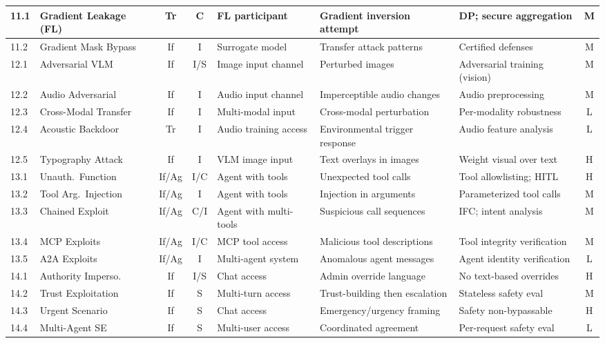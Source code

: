 \documentclass[conference]{IEEEtran}
\begin{document}
{\begin{longtable}{p{0.7cm}p{1.5cm}ccp{1.6cm}p{1.5cm}p{1.6cm}c}
\midrule
11.1 & Gradient Leakage (FL) & Tr & C & FL participant & Gradient inversion attempt & DP; secure aggregation & M \\
\midrule
11.2 & Gradient Mask Bypass & If & I & Surrogate model & Transfer attack patterns & Certified defenses & M \\
\midrule
12.1 & Adversarial VLM & If & I/S & Image input channel & Perturbed images & Adversarial training (vision) & M \\
\midrule
12.2 & Audio Adversarial & If & I & Audio input channel & Imperceptible audio changes & Audio preprocessing & M \\
\midrule
12.3 & Cross-Modal Transfer & If & I & Multi-modal input & Cross-modal perturbation & Per-modality robustness & L \\
\midrule
12.4 & Acoustic Backdoor & Tr & I & Audio training access & Environmental trigger response & Audio feature analysis & L \\
\midrule
12.5 & Typography Attack & If & I & VLM image input & Text overlays in images & Weight visual over text & H \\
\midrule
13.1 & Unauth.\ Function & If/Ag & I/C & Agent with tools & Unexpected tool calls & Tool allowlisting; HITL & H \\
\midrule
13.2 & Tool Arg.\ Injection & If/Ag & I & Agent with tools & Injection in arguments & Parameterized tool calls & M \\
\midrule
13.3 & Chained Exploit & If/Ag & C/I & Agent with multi-tools & Suspicious call sequences & IFC; intent analysis & M \\
\midrule
13.4 & MCP Exploits & If/Ag & I/C & MCP tool access & Malicious tool descriptions & Tool integrity verification & M \\
\midrule
13.5 & A2A Exploits & If/Ag & I & Multi-agent system & Anomalous agent messages & Agent identity verification & L \\
\midrule
14.1 & Authority Imperso. & If & I/S & Chat access & Admin override language & No text-based overrides & H \\
\midrule
14.2 & Trust Exploitation & If & S & Multi-turn access & Trust-building then escalation & Stateless safety eval & M \\
\midrule
14.3 & Urgent Scenario & If & S & Chat access & Emergency/urgency framing & Safety non-bypassable & H \\
\midrule
14.4 & Multi-Agent SE & If & S & Multi-user access & Coordinated agreement & Per-request safety eval & L \\

\end{longtable}}
\end{document}
